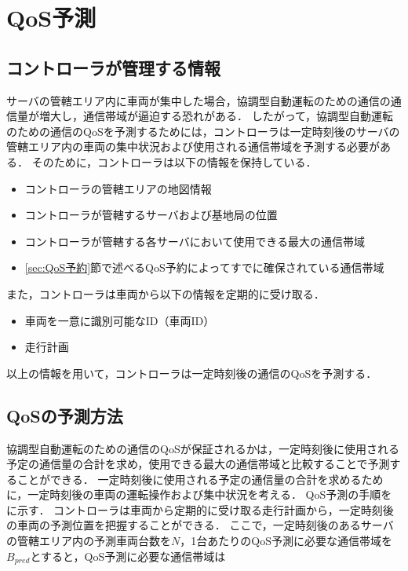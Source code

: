 \documentclass[a4paper,11pt,uplatex]{ujreport}
\begin{document}
\section{QoS予測}
\label{sec:QoS予測}

\subsection{コントローラが管理する情報}

サーバの管轄エリア内に車両が集中した場合，協調型自動運転のための通信の通信量が増大し，通信帯域が逼迫する恐れがある．
したがって，協調型自動運転のための通信のQoSを予測するためには，コントローラは一定時刻後のサーバの管轄エリア内の車両の集中状況および使用される通信帯域を予測する必要がある．
そのために，コントローラは以下の情報を保持している．

\begin{itemize}
\item コントローラの管轄エリアの地図情報
\item コントローラが管轄するサーバおよび基地局の位置
\item コントローラが管轄する各サーバにおいて使用できる最大の通信帯域
\item \ref{sec:QoS予約}節で述べるQoS予約によってすでに確保されている通信帯域
\end{itemize}

また，コントローラは車両から以下の情報を定期的に受け取る．

\begin{itemize}
\item 車両を一意に識別可能なID（車両ID）
\item 走行計画
\end{itemize}

以上の情報を用いて，コントローラは一定時刻後の通信のQoSを予測する．

\subsection{QoSの予測方法}
\label{QoSの予測方法}

協調型自動運転のための通信のQoSが保証されるかは，一定時刻後に使用される予定の通信量の合計を求め，使用できる最大の通信帯域と比較することで予測することができる．
一定時刻後に使用される予定の通信量の合計を求めるために，一定時刻後の車両の運転操作および集中状況を考える．
QoS予測の手順をに示す．
コントローラは車両から定期的に受け取る走行計画から，一定時刻後の車両の予測位置を把握することができる．
ここで，一定時刻後のあるサーバの管轄エリア内の予測車両台数を$N$，1台あたりのQoS予測に必要な通信帯域を$B_{pred}$とすると，QoS予測に必要な通信帯域は
\end{document}
